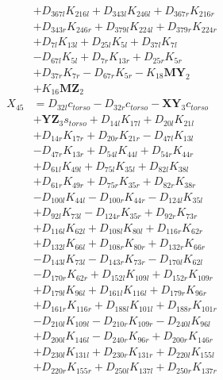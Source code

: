 \begin{multicols}{2}
\begin{align}
&+ D_{367l}K_{216l} + D_{343l}K_{246l} + D_{367r}K_{216r}  \nonumber \\
&+ D_{343r}K_{246r} + D_{379l}K_{224l} + D_{379r}K_{224r}  \nonumber \\
&+ D_{7l}K_{13l} + D_{25l}K_{5l} + D_{37l}K_{7l}  \nonumber \\
&- D_{67l}K_{5l} + D_{7r}K_{13r} + D_{25r}K_{5r}  \nonumber \\
&+ D_{37r}K_{7r} - D_{67r}K_{5r} - K_{18}\mathbf{MY}_2  \nonumber \\
&+ K_{16}\mathbf{MZ}_2 \nonumber \\
X_{45} &= D_{32l}c_{torso} - D_{32r}c_{torso} - \mathbf{XY}_3c_{torso}  \nonumber \\
&+ \mathbf{YZ}_3s_{torso} + D_{14l}K_{17l} + D_{20l}K_{21l}  \nonumber \\
&+ D_{14r}K_{17r} + D_{20r}K_{21r} - D_{47l}K_{13l}  \nonumber \\
&- D_{47r}K_{13r} + D_{54l}K_{44l} + D_{54r}K_{44r}  \nonumber \\
&+ D_{61l}K_{49l} + D_{75l}K_{35l} + D_{82l}K_{38l}  \nonumber \\
&+ D_{61r}K_{49r} + D_{75r}K_{35r} + D_{82r}K_{38r}  \nonumber \\
&- D_{100l}K_{44l} - D_{100r}K_{44r} - D_{124l}K_{35l}  \nonumber \\
&+ D_{92l}K_{73l} - D_{124r}K_{35r} + D_{92r}K_{73r}  \nonumber \\
&+ D_{116l}K_{62l} + D_{108l}K_{80l} + D_{116r}K_{62r}  \nonumber \\
&+ D_{132l}K_{66l} + D_{108r}K_{80r} + D_{132r}K_{66r}  \nonumber \\
&- D_{143l}K_{73l} - D_{143r}K_{73r} - D_{170l}K_{62l}  \nonumber \\
&- D_{170r}K_{62r} + D_{152l}K_{109l} + D_{152r}K_{109r}  \nonumber \\
&+ D_{179l}K_{96l} + D_{161l}K_{116l} + D_{179r}K_{96r}  \nonumber \\
&+ D_{161r}K_{116r} + D_{188l}K_{101l} + D_{188r}K_{101r}  \nonumber \\
&- D_{210l}K_{109l} - D_{210r}K_{109r} - D_{240l}K_{96l}  \nonumber \\
&+ D_{200l}K_{146l} - D_{240r}K_{96r} + D_{200r}K_{146r}  \nonumber \\
&+ D_{230l}K_{131l} + D_{230r}K_{131r} + D_{220l}K_{155l}  \nonumber \\
&+ D_{220r}K_{155r} + D_{250l}K_{137l} + D_{250r}K_{137r}  \nonumber \\

\end{align}
\end{multicols}

